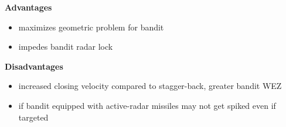 \begin{multicols}{2}
    \textbf{Advantages}
    \begin{itemize}
        \item maximizes geometric problem for bandit
        \item impedes bandit radar lock
    \end{itemize}
    \vfill\null\columnbreak
    \textbf{Disadvantages}
    \begin{itemize}
        \item increased closing velocity compared to stagger-back, 
        greater bandit WEZ
        \item if bandit equipped with active-radar missiles may not get spiked even if targeted
    \end{itemize}
\end{multicols}

